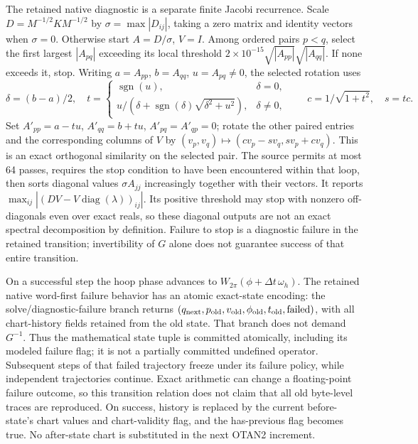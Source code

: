 The retained native diagnostic is a separate finite Jacobi recurrence. Scale
$D=M^{-1/2}KM^{-1/2}$ by $\sigma=\max|D_{ij}|$, taking a zero matrix and identity
vectors when $\sigma=0$. Otherwise start $A=D/\sigma$, $V=I$. Among ordered
pairs $p<q$, select the first largest $|A_{pq}|$ exceeding its local threshold
$2\times10^{-15}\sqrt{|A_{pp}|}\sqrt{|A_{qq}|}$. If none exceeds it, stop.
Writing $a=A_{pp}$, $b=A_{qq}$, $u=A_{pq}\ne0$, the selected rotation uses
\begin{equation}
 \delta=(b-a)/2,\quad
 t=\begin{cases}\operatorname{sgn}(u),&\delta=0,\\
 u/(\delta+\operatorname{sgn}(\delta)\sqrt{\delta^2+u^2}),&\delta\ne0,
 \end{cases}\qquad c=1/\sqrt{1+t^2},\quad s=tc .
\end{equation}
Set $A'_{pp}=a-tu$, $A'_{qq}=b+tu$, $A'_{pq}=A'_{qp}=0$; rotate the other
paired entries and the corresponding columns of $V$ by
$(v_p,v_q)\mapsto(cv_p-sv_q,sv_p+cv_q)$. This is an exact orthogonal similarity
on the selected pair. The source permits at most 64 passes, requires the stop
condition to have been encountered within that loop, then sorts diagonal
values $\sigma A_{jj}$ increasingly together with their vectors. It reports
$\max_{ij}|(DV-V\operatorname{diag}(\lambda))_{ij}|$.
Its positive threshold may stop with nonzero off-diagonals even over exact
reals, so these diagonal outputs are not an exact spectral decomposition by
definition. Failure to stop is a diagnostic failure in the retained transition;
invertibility of $G$ alone does not guarantee success of that entire transition.

On a successful step the hoop phase advances to
$W_{2\pi}(\phi+\Delta t\,\omega_h)$. The retained native word-first failure
behavior has an atomic exact-state encoding: the solve/diagnostic-failure branch returns
$(q_{\rm next},p_{\rm old},v_{\rm old},\phi_{\rm old},t_{\rm old},\mathrm{failed})$,
with all chart-history fields retained from the old state. That branch does not
demand $G^{-1}$. Thus the mathematical state tuple is committed atomically,
including its modeled failure flag; it is not a partially committed undefined
operator. Subsequent steps of that failed trajectory freeze under its failure
policy, while independent trajectories continue. Exact arithmetic can change
a floating-point failure outcome, so this transition relation does not claim
that all old byte-level traces are reproduced.
On success, history is replaced by the current before-state's chart values
and chart-validity flag, and the has-previous flag becomes true. No after-state
chart is substituted in the next OTAN2 increment.

